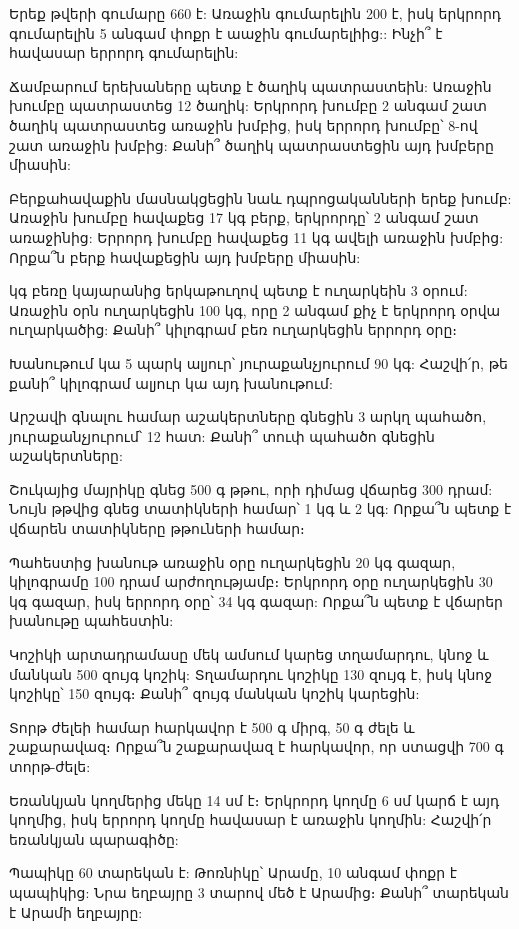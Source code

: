 \problem
Երեք թվերի գումարը 660 է: Առաջին գումարելին 200 է, իսկ երկրորդ 
գումարելին 5 անգամ փոքր է աաջին գումարելիից:: Ինչի՞ է հավասար 
երրորդ գումարելին:

\problem
Ճամբարում երեխաները պետք է ծաղիկ պատրաստեին: Առաջին խումբը 
պատրաստեց 12 ծաղիկ: Երկրորդ խումբը 2 անգամ շատ ծաղիկ պատրաստեց 
առաջին խմբից, իսկ երրորդ խումբը՝ 8-ով շատ առաջին խմբից: Քանի՞ 
ծաղիկ պատրաստեցին այդ խմբերը միասին:

\problem
Բերքահավաքին մասնակցեցին նաև դպրոցականների երեք խումբ: Առաջին 
խումբը հավաքեց 17 կգ բերք, երկրորդը՝ 2 անգամ շատ առաջինից: Երրորդ 
խումբը հավաքեց 11 կգ ավելի առաջին խմբից: Որքա՞ն բերք հավաքեցին 
այդ խմբերը միասին:

 կգ բեռը կայարանից երկաթուղով պետք է ուղարկեին 3 օրում: Առաջին 
օրն ուղարկեցին 100 կգ, որը 2 անգամ քիչ է երկրորդ օրվա ուղարկածից: 
Քանի՞ կիլոգրամ բեռ ուղարկեցին երրորդ օրը։

\problem
Խանութում կա 5 պարկ ալյուր՝ յուրաքանչյուրում 90 կգ: Հաշվի՛ր, թե 
քանի՞ կիլոգրամ ալյուր կա այդ խանութում:

\problem
Արշավի գնալու համար աշակերտները գնեցին 3 արկղ պահածո, յուրաքանչյուրում՝ 
12 հատ: Քանի՞ տուփ պահածո գնեցին աշակերտները:

\problem
Շուկայից մայրիկը գնեց 500 գ թթու, որի դիմաց վճարեց 300 դրամ: Նույն 
թթվից գնեց տատիկների համար՝ 1 կգ և 2 կգ: Որքա՞ն պետք է վճարեն 
տատիկները թթուների համար։

\problem
Պահեստից խանութ առաջին օրը ուղարկեցին 20 կգ գազար, կիլոգրամը 100 
դրամ արժողությամբ։ Երկրորդ օրը ուղարկեցին 30 կգ գազար, իսկ երրորդ 
օրը՝ 34 կգ գազար: Որքա՞ն պետք է վճարեր խանութը պահեստին:

\problem
Կոշիկի արտադրամասը մեկ ամսում կարեց տղամարդու, կնոջ և մանկան 500 
զույգ կոշիկ: Տղամարդու կոշիկը 130 զույգ է, իսկ կնոջ կոշիկը՝ 150 
զույգ։ Քանի՞ զույգ մանկան կոշիկ կարեցին:

\problem
Տորթ ժելեի համար հարկավոր է 500 գ միրգ, 50 գ ժելե և շաքարավազ։ 
Որքա՞ն շաքարավազ է հարկավոր, որ ստացվի 700 գ տորթ-ժելե:

\problem
Եռանկյան կողմերից մեկը 14 սմ է։ Երկրորդ կողմը 6 սմ կարճ է այդ 
կողմից, իսկ երրորդ կողմը հավասար է առաջին կողմին: Հաշվի՛ր եռանկյան 
պարագիծը:

\problem
Պապիկը 60 տարեկան է: Թոռնիկը՝ Արամը, 10 անգամ փոքր է պապիկից: 
Նրա եղբայրը 3 տարով մեծ է Արամից։ Քանի՞ տարեկան է Արամի եղբայրը:


\bye
